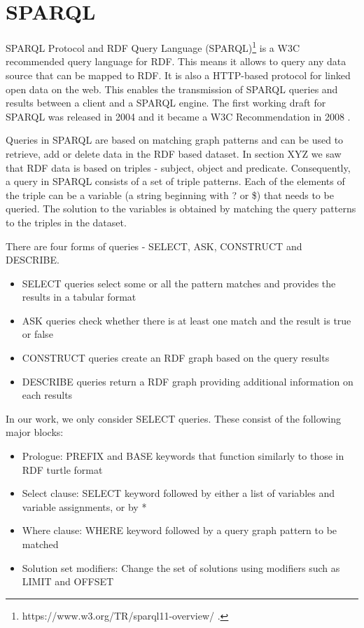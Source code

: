 \section{SPARQL}
SPARQL Protocol and RDF Query Language (SPARQL)\footnote{https://www.w3.org/TR/sparql11-overview/ .} is a W3C recommended query language for RDF. This means it allows to query any data source that can be mapped to RDF. It is also a HTTP-based protocol for linked open data on the web. This enables the transmission of SPARQL queries and results between a client and a SPARQL engine. The first working draft for SPARQL was released in 2004 and it became a W3C Recommendation in 2008 \cite{Perez2009}. 

Queries in SPARQL are based on matching graph patterns and can be used to retrieve, add or delete data in the RDF based dataset. In section XYZ we saw that RDF data is based on triples - subject, object and predicate. Consequently, a query in SPARQL consists of a set of triple patterns. Each of the elements of the triple can be a variable (a string beginning with ? or \$) that needs to be queried. The solution to the variables is obtained by matching the query patterns to the triples in the dataset.

There are four forms of queries - SELECT, ASK, CONSTRUCT and DESCRIBE. 
\begin{itemize}
\item SELECT queries select some or all the pattern matches and provides the results in a tabular format
\item ASK queries check whether there is at least one match and the result is true or false
\item CONSTRUCT queries create an RDF graph based on the query results
\item DESCRIBE queries return a RDF graph providing additional information on each results
\end{itemize}

In our work, we only consider SELECT queries. These consist of the following major blocks:
\begin{itemize}
\item Prologue: PREFIX and BASE keywords that function similarly to those in RDF turtle format
\item Select clause: SELECT keyword followed by either a list of variables and variable assignments, or by *
\item Where clause: WHERE keyword followed by a query graph pattern to be matched
\item Solution set modifiers: Change the set of solutions using modifiers such as LIMIT and OFFSET
\end{itemize}

